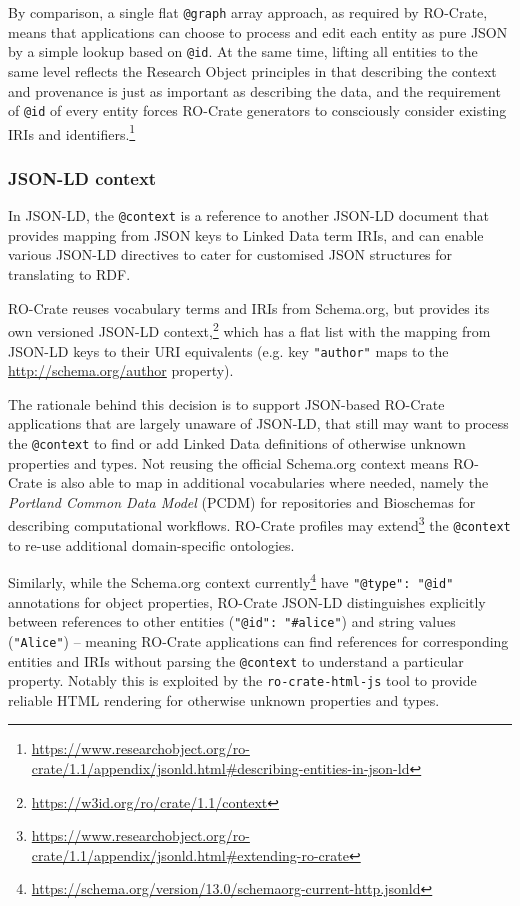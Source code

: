 \documentclass[ds,v1.1.2,openaccess]{iosart2x}%
\begin{document}
By comparison, a single flat \texttt{@graph} array approach, as required by
RO-Crate, means that applications can choose to process and edit each
entity as pure JSON by a simple lookup based on \texttt{@id}. At the same
time, lifting all entities to the same level reflects the Research
Object principles \cite{doi:10.1016/j.future.2011.08.004} in that
describing the context and provenance is just as important as
describing the data, and the requirement of \texttt{@id} of every entity
forces RO-Crate generators to consciously consider existing IRIs and
identifiers.\footnote{\url{https://www.researchobject.org/ro-crate/1.1/appendix/jsonld.html\#describing-entities-in-json-ld}}

\subsubsection{JSON-LD context}

In JSON-LD, the \texttt{@context} is a reference to another JSON-LD document
that provides mapping from JSON keys to Linked Data term IRIs, and can
enable various JSON-LD directives to cater for customised JSON
structures for translating to RDF.

RO-Crate reuses vocabulary terms and IRIs from Schema.org, but provides
its own versioned JSON-LD
context,\footnote{\url{https://w3id.org/ro/crate/1.1/context}} which has a flat list
with the mapping from JSON-LD keys to their URI equivalents (e.g. key
\texttt{"author"} maps to the \url{http://schema.org/author} property).

The rationale behind this decision is to support JSON-based RO-Crate
applications that are largely unaware of JSON-LD, that still may want
to process the \texttt{@context} to find or add Linked Data definitions of
otherwise unknown properties and types. Not reusing the official
Schema.org context means RO-Crate is also able to map in additional
vocabularies where needed, namely the \textit{Portland Common Data Model}
(PCDM) \cite{pcdm} for repositories and Bioschemas \cite{bioschemas_2017} for
describing computational workflows. RO-Crate profiles may
extend\footnote{\url{https://www.researchobject.org/ro-crate/1.1/appendix/jsonld.html\#extending-ro-crate}}
the \texttt{@context} to re-use additional domain-specific ontologies.

Similarly, while the Schema.org context
currently\footnote{\url{https://schema.org/version/13.0/schemaorg-current-http.jsonld}}
have \texttt{"@type": "@id"} annotations for object properties, RO-Crate
JSON-LD distinguishes explicitly between references to other entities
(\texttt{{"@id": "\#alice"}})
and string values (\texttt{"Alice"}) -- meaning
RO-Crate applications can find references for corresponding entities
and IRIs without parsing the \texttt{@context} to understand a particular
property. Notably this is exploited by the \texttt{ro-crate-html-js}
\cite{ro-crate-html-js} tool to provide reliable HTML rendering for
otherwise unknown properties and types.
\end{document}
